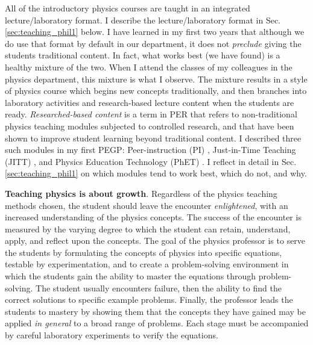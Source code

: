 \documentclass[../../main.tex]{subfiles}
\begin{document}
All of the introductory physics courses are taught in an integrated lecture/laboratory format.  I describe the lecture/laboratory format in Sec. \ref{sec:teaching_phil1} below.  I have learned in my first two years that although we do use that format by default in our department, it does not \textit{preclude} giving the students traditional content.  In fact, what works best (we have found) is a healthy mixture of the two.  When I attend the classes of my colleagues in the physics department, this mixture is what I observe.  The mixture results in a style of physics course which begins new concepts traditionally, and then branches into laboratory activities and research-based lecture content when the students are ready.  \textit{Researched-based content} is a term in PER that refers to non-traditional physics teaching modules subjected to controlled research, and that have been shown to improve student learning beyond traditional content.  I described three such modules in my first PEGP: Peer-instruction (PI) \cite{mazur2013peer}, Just-in-Time Teaching (JITT) \cite{jitt}, and Physics Education Technology (PhET) \cite{phet}.  I reflect in detail in Sec. \ref{sec:teaching_phil1} on which modules tend to work best, which do not, and why. \\ \hspace{0.1cm}

\textbf{Teaching physics is about growth}.  Regardless of the physics teaching methods chosen, the student should leave the encounter \textit{enlightened}, with an increased understanding of the physics concepts.  The success of the encounter is measured by the varying degree to which the student can retain, understand, apply, and reflect upon the concepts.  The goal of the physics professor is to serve the students by formulating the concepts of physics into specific equations, testable by experimentation, and to create a problem-solving environment in which the students gain the ability to master the equations through problem-solving.  The student usually encounters failure, then the ability to find the correct solutions to specific example problems.  Finally, the professor leads the students to mastery by showing them that the concepts they have gained may be applied \textit{in general} to a broad range of problems. Each stage must be accompanied by careful laboratory experiments to verify the equations. \\ \hspace{0.1cm}
\end{document}
